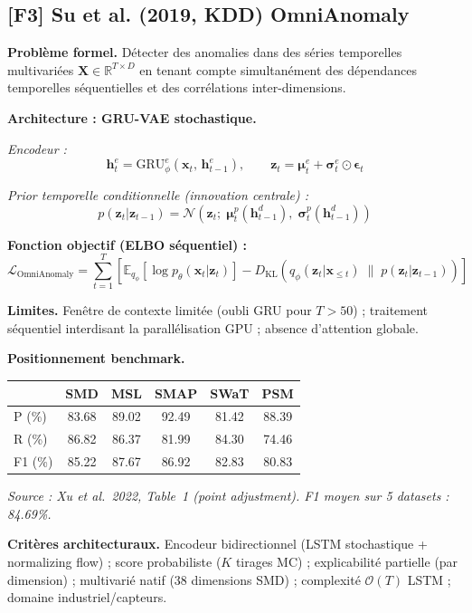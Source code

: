 \documentclass[12pt,a4paper]{article}
\begin{document}
\subsection{[F3] Su et al. (2019, KDD)  OmniAnomaly}

\textbf{Problème formel.} Détecter des anomalies dans des séries temporelles
multivariées $\mathbf{X} \in \mathbb{R}^{T \times D}$ en tenant compte
simultanément des dépendances temporelles séquentielles et des corrélations
inter-dimensions.

\textbf{Architecture : GRU-VAE stochastique.}

\textit{Encodeur :}
$$\mathbf{h}^e_t = \mathrm{GRU}_\phi^e(\mathbf{x}_t,\,\mathbf{h}^e_{t-1}),
\qquad \mathbf{z}_t = \boldsymbol{\mu}^e_t +
\boldsymbol{\sigma}^e_t \odot \boldsymbol{\epsilon}_t$$

\textit{Prior temporelle conditionnelle (innovation centrale) :}
$$p(\mathbf{z}_t | \mathbf{z}_{t-1}) = \mathcal{N}\!\left(\mathbf{z}_t;\;
\boldsymbol{\mu}^p_t(\mathbf{h}^d_{t-1}),\;
\boldsymbol{\sigma}^p_t(\mathbf{h}^d_{t-1})\right)$$

\textbf{Fonction objectif (ELBO séquentiel) :}
$$\mathcal{L}_{\mathrm{OmniAnomaly}} = \sum_{t=1}^T\!\left[
\mathbb{E}_{q_\phi}\!\left[\log p_\theta(\mathbf{x}_t|\mathbf{z}_t)\right]
- D_{\mathrm{KL}}\!\left(q_\phi(\mathbf{z}_t|\mathbf{x}_{\leq t})\;\|\;
p(\mathbf{z}_t|\mathbf{z}_{t-1})\right)\right]$$

\textbf{Limites.} Fenêtre de contexte limitée (oubli GRU pour $T > 50$) ;
traitement séquentiel interdisant la parallélisation GPU ; absence d'attention
globale.

\textbf{Positionnement benchmark.}

\smallskip
\begin{center}
\small
\begin{tabular}{lccccc}
\toprule
& SMD & MSL & SMAP & SWaT & PSM \\
\midrule
P (\%) & 83.68 & 89.02 & 92.49 & 81.42 & 88.39 \\
R (\%) & 86.82 & 86.37 & 81.99 & 84.30 & 74.46 \\
F1 (\%) & 85.22 & 87.67 & 86.92 & 82.83 & 80.83 \\
\bottomrule
\end{tabular}
\end{center}
\smallskip
\noindent\textit{\small Source : Xu et al.\ 2022, Table~1 (point adjustment).
F1 moyen sur 5 datasets : 84.69\%.}

\textbf{Critères architecturaux.} Encodeur bidirectionnel (LSTM stochastique +
normalizing flow) ; score probabiliste ($K$ tirages MC) ; explicabilité partielle
(par dimension) ; multivarié natif (38 dimensions SMD) ;
complexité $\mathcal{O}(T)$ LSTM ; domaine industriel/capteurs.
\end{document}
